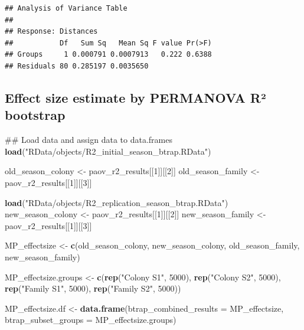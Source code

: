 \documentclass[]{article}
\newenvironment{Shaded}{\begin{snugshade}}{\end{snugshade}}
\newcommand{\KeywordTok}[1]{\textcolor[rgb]{0.13,0.29,0.53}{\textbf{#1}}}
\newcommand{\DataTypeTok}[1]{\textcolor[rgb]{0.13,0.29,0.53}{#1}}
\newcommand{\DecValTok}[1]{\textcolor[rgb]{0.00,0.00,0.81}{#1}}
\newcommand{\StringTok}[1]{\textcolor[rgb]{0.31,0.60,0.02}{#1}}
\newcommand{\NormalTok}[1]{#1}
\begin{document}
\begin{verbatim}
## Analysis of Variance Table
## 
## Response: Distances
##           Df   Sum Sq   Mean Sq F value Pr(>F)
## Groups     1 0.000791 0.0007913   0.222 0.6388
## Residuals 80 0.285197 0.0035650
\end{verbatim}

\subsection{Effect size estimate by PERMANOVA R²
bootstrap}\label{effect-size-estimate-by-permanova-r-bootstrap}

\begin{Shaded}
\begin{Highlighting}[]
\NormalTok{## Load data and assign data to data.frames}
\KeywordTok{load}\NormalTok{(}\StringTok{"RData/objects/R2_initial_season_btrap.RData"}\NormalTok{)}

\NormalTok{old_season_colony <-}\StringTok{ }\NormalTok{paov_r2_results[[}\DecValTok{1}\NormalTok{]][[}\DecValTok{2}\NormalTok{]]}
\NormalTok{old_season_family <-}\StringTok{ }\NormalTok{paov_r2_results[[}\DecValTok{1}\NormalTok{]][[}\DecValTok{3}\NormalTok{]]}

\KeywordTok{load}\NormalTok{(}\StringTok{"RData/objects/R2_replication_season_btrap.RData"}\NormalTok{)}
\NormalTok{new_season_colony <-}\StringTok{ }\NormalTok{paov_r2_results[[}\DecValTok{1}\NormalTok{]][[}\DecValTok{2}\NormalTok{]]}
\NormalTok{new_season_family <-}\StringTok{ }\NormalTok{paov_r2_results[[}\DecValTok{1}\NormalTok{]][[}\DecValTok{3}\NormalTok{]]}

\NormalTok{MP_effectsize <-}\StringTok{ }\KeywordTok{c}\NormalTok{(old_season_colony, new_season_colony, }
\NormalTok{                   old_season_family, new_season_family)}

\NormalTok{MP_effectsize.groups <-}\StringTok{ }\KeywordTok{c}\NormalTok{(}\KeywordTok{rep}\NormalTok{(}\StringTok{"Colony S1"}\NormalTok{, }\DecValTok{5000}\NormalTok{),}
                          \KeywordTok{rep}\NormalTok{(}\StringTok{"Colony S2"}\NormalTok{, }\DecValTok{5000}\NormalTok{),}
                          \KeywordTok{rep}\NormalTok{(}\StringTok{"Family S1"}\NormalTok{, }\DecValTok{5000}\NormalTok{), }
                          \KeywordTok{rep}\NormalTok{(}\StringTok{"Family S2"}\NormalTok{, }\DecValTok{5000}\NormalTok{))}

\NormalTok{MP_effectsize.df <-}\StringTok{ }\KeywordTok{data.frame}\NormalTok{(}\DataTypeTok{btrap_combined_results =}\NormalTok{ MP_effectsize,}
                               \DataTypeTok{btrap_subset_groups =}\NormalTok{ MP_effectsize.groups)}
\end{Highlighting}
\end{Shaded}
\end{document}
